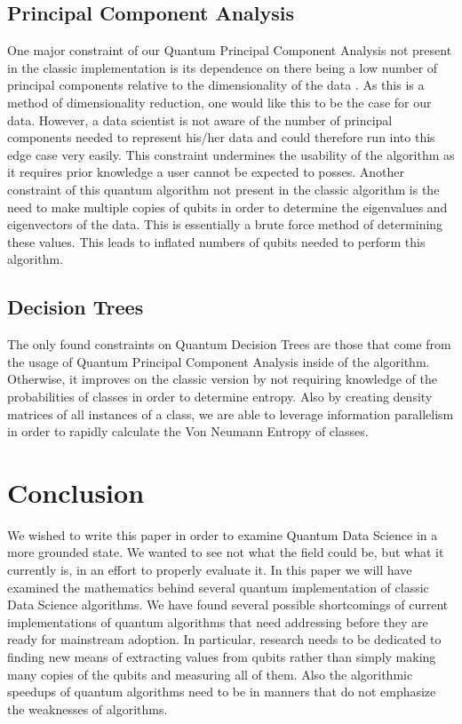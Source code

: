 \documentclass[conference]{IEEEtran}
\begin{document}
\subsection{Principal Component Analysis}
One major constraint of our Quantum Principal Component Analysis not present in the classic implementation is its dependence on there being a low number of principal components relative to the dimensionality of the data \cite{b6}. As this is a method of dimensionality reduction, one would like this to be the case for our data. However, a data scientist is not aware of the number of principal components needed to represent his/her data and could therefore run into this edge case very easily. This constraint undermines the usability of the algorithm as it requires prior knowledge a user cannot be expected to posses. \newline
\indent Another constraint of this quantum algorithm not present in the classic algorithm is the need to make multiple copies of qubits in order to determine the eigenvalues and eigenvectors of the data. This is essentially a brute force method of determining these values. This leads to inflated numbers of qubits needed to perform this algorithm.  
\subsection{Decision Trees}
The only found constraints on Quantum Decision Trees are those that come from the usage of Quantum Principal Component Analysis inside of the algorithm. Otherwise, it improves on the classic version by not requiring knowledge of the probabilities of classes in order to determine entropy. Also by creating density matrices of all instances of a class, we are able to leverage information parallelism in order to rapidly calculate the Von Neumann Entropy of classes.   

\section{Conclusion}
We wished to write this paper in order to examine Quantum Data Science in a more grounded state. We wanted to see not what the field could be, but what it currently is, in an effort to properly evaluate it. In this paper we will have examined the mathematics behind several quantum implementation of classic Data Science algorithms. We have found several possible shortcomings of current implementations of quantum algorithms that need addressing before they are ready for mainstream adoption. In particular, research needs to be dedicated to finding new means of extracting values from qubits rather than simply making many copies of the qubits and measuring all of them. Also the algorithmic speedups of quantum algorithms need to be in manners that do not emphasize the weaknesses of algorithms.   
\end{document}
